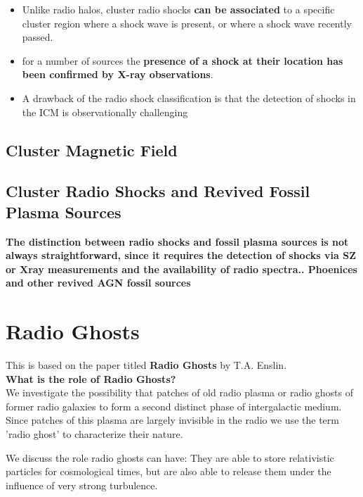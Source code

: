 \documentclass[11pt]{report}
\newcommand{\tbf}[1]{\textbf{#1}}
\newcommand{\cbox}{tcolorbox}
\begin{document}
\begin{itemize}
\begin{itemize}
 \item  Unlike radio halos, cluster radio shocks \tbf{can be associated} to a specific cluster region where a shock wave is present, or where a shock wave recently passed.
 \item for a number of sources the \tbf{presence of a shock at their location has been confirmed by X-ray observations}.
 \item  A drawback of the radio shock classification is that the detection of shocks in the ICM is observationally challenging
 \end{itemize}
 
 \end{itemize}
 \section{Cluster Magnetic Field}
 \section{Cluster Radio Shocks and Revived Fossil Plasma Sources}
 \textbf{The distinction between radio shocks and fossil plasma sources is not always straightforward, since it requires the detection of shocks via SZ or Xray measurements and the availability of radio spectra.. Phoenices and other revived AGN fossil sources  }

\chapter{Radio Ghosts}
This is based on the paper titled \tbf{Radio Ghosts} by T.A. Enslin.\\

\tbf{What is the role of Radio Ghosts?}\\

We investigate the possibility that patches of old radio plasma or radio ghosts of former radio galaxies to form a second distinct phase of intergalactic medium. \\


 Since patches of this plasma are largely invisible in the radio we use the term 'radio ghost' to characterize their nature.\\
 
 \begin{\cbox}
  We discuss the role radio ghosts can have: They are able to store relativistic particles for cosmological times, but are also able to release them under the influence of very strong turbulence. 
  \end{\cbox}
  
\end{document}
